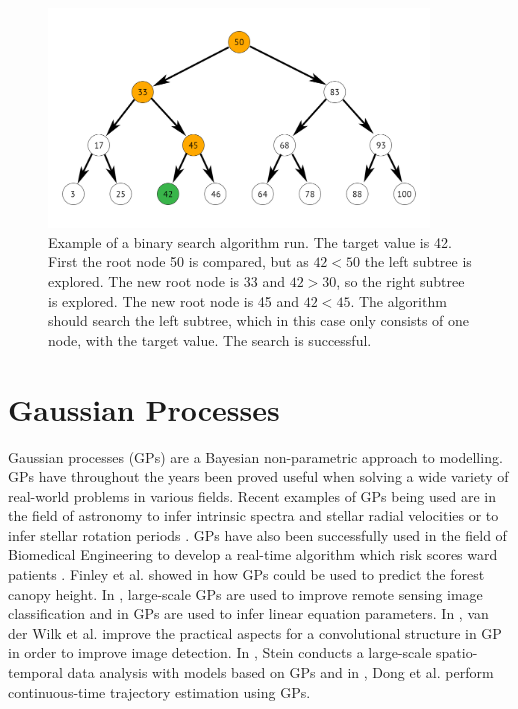 \begin{figure}[t!]
    \centering
    \includegraphics[width=0.9\textwidth]{figures/binary_search_algorithm}
    \caption[Example of a binary search algorithm run]
    {\small Example of a binary search algorithm run.
    The target value is 42.
    First the root node 50 is compared, but as $42 < 50$ the left subtree is explored.
    The new root node is 33 and $42 > 30$, so the right subtree is explored.
    The new root node is 45 and $42 < 45$.
    The algorithm should search the left subtree, which in this case only consists of one node, with the target value.
    The search is successful.}
    \label{fig:binary-search-algorithm}
\end{figure}

\section{Gaussian Processes}
Gaussian processes \cite{Rasmussen2006} (GPs) are a Bayesian non-parametric approach to modelling.
GPs have throughout the years been proved useful when solving a wide variety of real-world problems in various fields.
Recent examples of GPs being used are in the field of astronomy to infer intrinsic spectra and stellar radial velocities \cite{Czekala2017} or to infer stellar rotation periods \cite{Angus2017}.
GPs have also been successfully used in the field of Biomedical Engineering to develop a real-time algorithm which risk scores ward patients \cite{Alaa2018}.
Finley et al. showed in \cite{Finley2017} how GPs could be used to predict the forest canopy height.
In \cite{8082124}, large-scale GPs are used to improve remote sensing image classification and in \cite{Raissi2017} GPs are used to infer linear equation parameters.
In \cite{NIPS2017_6877}, van der Wilk et al. improve the practical aspects for a convolutional structure in GP in order to improve image detection.
In \cite{Stein2017}, Stein conducts a large-scale spatio-temporal data analysis with models based on GPs and in \cite{Dong2017}, Dong et al. perform continuous-time trajectory estimation using GPs.

